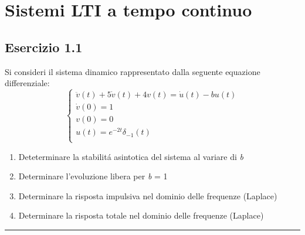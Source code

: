 \documentclass[12pt,a4paper]{article}
\begin{document}
	\section{Sistemi LTI a tempo continuo}
	\subsection*{Esercizio 1.1}
	Si consideri il sistema dinamico rappresentato dalla seguente equazione differenziale:
	\[
		\begin{cases}
   		\ddot{v}(t) + 5\dot{v}(t) + 4v(t) = \dot{u}(t) - bu(t) \\
   		\dot{v}(0) = 1 \\
   		v(0) = 0 \\
   		u(t) = e^{-2t} \delta_{-1}(t) \\
   		\end{cases}
   	\]
   	\begin{enumerate}
   		\item Deteterminare la stabilit\'a asintotica del sistema al variare di \textit{b}
   		\item Determinare l'evoluzione libera per \textit{b} = 1
   		\item Determinare la risposta impulsiva nel dominio delle frequenze (Laplace)
   		\item Determinare la risposta totale nel dominio delle frequenze (Laplace)
   	\end{enumerate}
   	\par\noindent\rule{\textwidth}{0.4pt}
\end{document}
